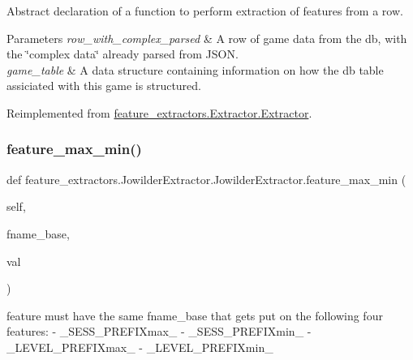 Abstract declaration of a function to perform extraction of features from a row. 


\begin{DoxyParams}{Parameters}
{\em row\+\_\+with\+\_\+complex\+\_\+parsed} & A row of game data from the db, with the \char`\"{}complex data\char`\"{} already parsed from J\+S\+ON. \\
\hline
{\em game\+\_\+table} & A data structure containing information on how the db table assiciated with this game is structured. \\
\hline
\end{DoxyParams}


Reimplemented from \mbox{\hyperlink{classfeature__extractors_1_1_extractor_1_1_extractor_a98fc31f77b3c7650f49480097f1f6da4}{feature\+\_\+extractors.\+Extractor.\+Extractor}}.

\mbox{\label{classfeature__extractors_1_1_jowilder_extractor_1_1_jowilder_extractor_ae1142eae96013e6e24ee4108ca3fcfd7}} 
\subsubsection{\texorpdfstring{feature\_max\_min()}{feature\_max\_min()}}
{\footnotesize\ttfamily def feature\+\_\+extractors.\+Jowilder\+Extractor.\+Jowilder\+Extractor.\+feature\+\_\+max\+\_\+min (\begin{DoxyParamCaption}\item[{}]{self,  }\item[{}]{fname\+\_\+base,  }\item[{}]{val }\end{DoxyParamCaption})}

\begin{DoxyVerb}feature must have the same fname_base that gets put on the following four features:
- {_SESS_PREFIX}max_
- {_SESS_PREFIX}min_
- {_LEVEL_PREFIX}max_
- {_LEVEL_PREFIX}min_ \end{DoxyVerb}
 \mbox{\label{classfeature__extractors_1_1_jowilder_extractor_1_1_jowilder_extractor_ac1169239387ab7be46219de619545be4}} 
